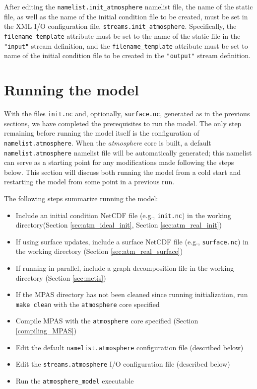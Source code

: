 After editing the {\tt namelist.init\_atmosphere} namelist file, the name of the static file, as well as the name of the initial condition file to be created, must be set in the XML I/O configuration file, {\tt streams.init\_atmosphere}. Specifically, the {\tt filename\_template} attribute must be set to the name of the static file in the {\tt "input"} stream definition, and the {\tt filename\_template} attribute must be set to name of the initial condition file to be created in the {\tt "output"} stream definition.

\section{Running the model}
\label{sec:atm_model_run}

With the files {\tt init.nc} and, optionally, {\tt surface.nc}, generated as in the previous sections, we have completed the prerequisites to run the model.  The only step remaining before running the model itself is the configuration of {\tt namelist.atmosphere}.  When the {\em atmosphere} core is built, a default {\tt namelist.atmosphere} namelist file will be automatically generated; this namelist can serve as a starting point for any modifications made following the steps below. This section will discuss both running the model from a cold start and restarting the model from some point in a previous run.

The following steps summarize running the model:

\begin{itemize}
\item Include an initial condition NetCDF file (e.g., {\tt init.nc}) in the working directory(Section \ref{sec:atm_ideal_init}, Section \ref{sec:atm_real_init})
\item If using surface updates, include a surface NetCDF file (e.g., {\tt surface.nc}) in the working directory (Section \ref{sec:atm_real_surface})
\item If running in parallel, include a graph decomposition file in the working directory (Section \ref{sec:metis})
\item If the MPAS directory has not been cleaned since running initialization, run {\tt make clean} with the {\tt atmosphere} core specified
\item Compile MPAS with the {\tt atmosphere} core specified (Section \ref{compiling_MPAS})
\item Edit the default {\tt namelist.atmosphere} configuration file (described below)
\item Edit the {\tt streams.atmosphere} I/O configuration file (described below)
\item Run the {\tt atmosphere\_model} executable
\end{itemize}

